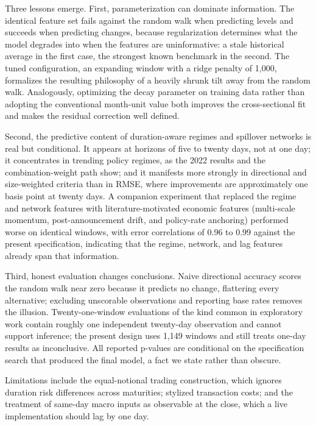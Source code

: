\documentclass[10pt]{article}
\begin{document}
Three lessons emerge. First, parameterization can dominate information. The identical feature set fails against the random walk when predicting levels and succeeds when predicting changes, because regularization determines what the model degrades into when the features are uninformative: a stale historical average in the first case, the strongest known benchmark in the second. The tuned configuration, an expanding window with a ridge penalty of 1{,}000, formalizes the resulting philosophy of a heavily shrunk tilt away from the random walk. Analogously, optimizing the decay parameter on training data rather than adopting the conventional month-unit value both improves the cross-sectional fit and makes the residual correction well defined.

Second, the predictive content of duration-aware regimes and spillover networks is real but conditional. It appears at horizons of five to twenty days, not at one day; it concentrates in trending policy regimes, as the 2022 results and the combination-weight path show; and it manifests more strongly in directional and size-weighted criteria than in RMSE, where improvements are approximately one basis point at twenty days. A companion experiment that replaced the regime and network features with literature-motivated economic features (multi-scale momentum, post-announcement drift, and policy-rate anchoring) performed worse on identical windows, with error correlations of 0.96 to 0.99 against the present specification, indicating that the regime, network, and lag features already span that information.

Third, honest evaluation changes conclusions. Naive directional accuracy scores the random walk near zero because it predicts no change, flattering every alternative; excluding unscorable observations and reporting base rates removes the illusion. Twenty-one-window evaluations of the kind common in exploratory work contain roughly one independent twenty-day observation and cannot support inference; the present design uses 1{,}149 windows and still treats one-day results as inconclusive. All reported p-values are conditional on the specification search that produced the final model, a fact we state rather than obscure.

Limitations include the equal-notional trading construction, which ignores duration risk differences across maturities; stylized transaction costs; and the treatment of same-day macro inputs as observable at the close, which a live implementation should lag by one day.
\end{document}
